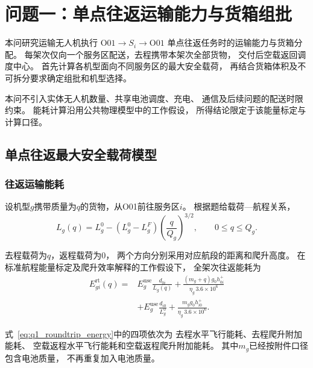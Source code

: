 \documentclass[bwprint]{gmcmthesis}
\begin{document}

\section{问题一：单点往返运输能力与货箱组批}

本问研究运输无人机执行
$\mathrm{O01}\rightarrow S_i\rightarrow\mathrm{O01}$
单点往返任务时的运输能力与货箱分配。
每架次仅向一个服务区配送，去程携带本架次全部货物，
交付后空载返回调度中心。
首先计算各机型面向不同服务区的最大安全载荷，
再结合货箱体积及不可拆分要求确定组批和机型选择。

本问不引入实体无人机数量、共享电池调度、充电、
通信及后续问题的配送时限约束。
能耗计算沿用公共物理模型中的工作假设，
所得结论限定于该能量标定与计算口径。

\subsection{单点往返最大安全载荷模型}

\subsubsection{往返运输能耗}

设机型$g$携带质量为$q$的货物，从O01前往服务区$i$。
根据题给载荷—航程关系，
\begin{equation}
    L_g(q)
    =
    L_g^0-
    \left(L_g^0-L_g^F\right)
    \left(\frac{q}{Q_g}\right)^{3/2},
    \qquad 0\leq q\leq Q_g.
    \label{eq:q1_range}
\end{equation}

去程载荷为$q$，返程载荷为0，
两个方向分别采用对应航段的距离和爬升高度。
在标准航程能量标定及爬升效率解释的工作假设下，
全架次往返能耗为
\begin{equation}
\begin{aligned}
    E_{gi}^{\mathrm{rt}}(q)
    ={}&
    E_g^{\mathrm{use}}\frac{d_{0i}}{L_g(q)}
    +
    \frac{(m_g+q)g_0h_{0i}^{+}}
    {\eta_g\,3.6\times10^6}
    \\
    &+
    E_g^{\mathrm{use}}\frac{d_{i0}}{L_g^0}
    +
    \frac{m_g g_0h_{i0}^{+}}
    {\eta_g\,3.6\times10^6}.
\end{aligned}
\label{eq:q1_roundtrip_energy}
\end{equation}

式~\eqref{eq:q1_roundtrip_energy}中的四项依次为
去程水平飞行能耗、去程爬升附加能耗、
空载返程水平飞行能耗和空载返程爬升附加能耗。
其中$m_g$已经按附件口径包含电池质量，
不再重复加入电池质量。
\end{document}
